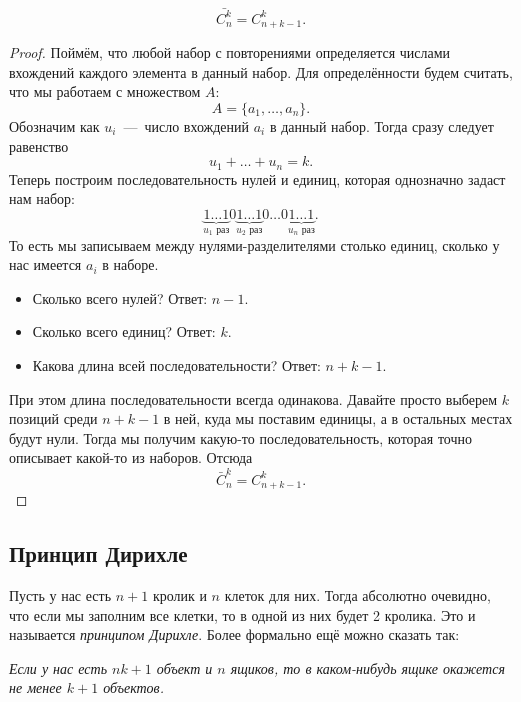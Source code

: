 \begin{multicols}{2}
      \begin{theorema}{}{}
        \[
          \bar{C_n^k} = C_{n + k - 1}^k.
        \]
      \end{theorema}

      \begin{proof}
        Поймём, что любой набор с повторениями определяется числами вхождений каждого элемента в данный набор. Для определённости будем считать, что мы работаем с множеством $A$:
        \[
          A = \{a_1, \dots, a_n\}.
        \]
        Обозначим как $u_i$~---~число вхождений $a_i$ в данный набор. Тогда сразу следует равенство
        \[
          u_1 + \ldots + u_n = k.
        \]
        Теперь построим последовательность нулей и единиц, которая однозначно задаст нам набор:
        \[
          \underbrace{1 \ldots 1}_{u_1 \text{ раз}}
          0
          \underbrace{1 \ldots 1}_{u_2 \text{ раз}}
          0 \ldots 0
          \underbrace{1 \ldots 1}_{u_n \text{ раз}}.
        \]
        То есть мы записываем между нулями-разделителями столько единиц, сколько у нас имеется $a_i$ в наборе.
        \begin{itemize}
          \item Сколько всего нулей? Ответ: $n - 1$.
          \item Сколько всего единиц? Ответ: $k$.
          \item Какова длина всей последовательности? Ответ: $n + k - 1$.
        \end{itemize}
        При этом длина последовательности всегда одинакова. Давайте просто выберем $k$ позиций среди $n + k - 1$ в ней, куда мы поставим единицы, а в остальных местах будут нули. Тогда мы получим какую-то последовательность, которая точно описывает какой-то из наборов. Отсюда
        \[
          \bar{C}_n^k = C_{n + k - 1}^k.
        \]
      \end{proof}

      \subsection*{Принцип Дирихле}

      \begin{definition}{}{}
        Пусть у нас есть $n + 1$ кролик и $n$ клеток для них. Тогда абсолютно очевидно, что если мы заполним все клетки, то в одной из них будет 2 кролика. Это и называется \textit{принципом Дирихле}. Более формально ещё можно сказать так:
        
        \textit{
        Если у нас есть $nk + 1$ объект и $n$ ящиков, то в каком-нибудь ящике окажется не менее $k + 1$ объектов.
        }
      \end{definition}


\end{multicols}

